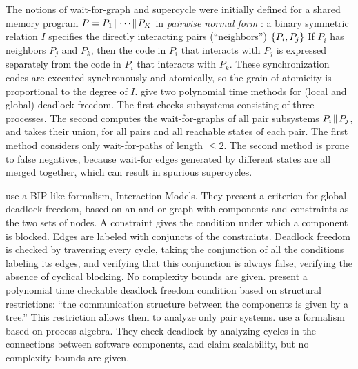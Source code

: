 
The notions of wait-for-graph and supercycle \cite{AC05,AE98}
were initially defined for a shared memory program
$P = P_1 \!\parallel\! \cdots \!\parallel\! P_K$ in \emph{pairwise normal form} \cite{Att16a,Att16b}: a binary
symmetric relation $I$ specifies the directly interacting pairs
(``neighbors'') $\{ P_i, P_j \}$ 
If $P_i$ has neighbors $P_j$ and $P_k$, then 
the code in $P_i$ that interacts with $P_j$ is expressed separately from
the code in $P_i$ that interacts with $P_k$. 
These synchronization codes are executed synchronously and
atomically, so the grain of atomicity is proportional to the
degree of $I$.
%
 give two polynomial time 
methods for (local and global) deadlock freedom.
The first checks subsystems consisting of three
processes. The second computes the wait-for-graphs of all pair subsystems $P_i \!\parallel\! P_j$,
and takes their union, for all pairs
and all reachable states of each pair.
The first method considers only wait-for-paths of length $\le 2$. 
The second method is prone to false negatives,
because wait-for edges generated by different states are
all merged together, which can result in spurious supercycles.


 use a BIP-like
formalism, Interaction Models. %
They present a criterion for global deadlock freedom, based on 
an and-or graph with components and constraints as the two sets of nodes. A
constraint gives the condition
under which a component is blocked. Edges are labeled with conjuncts
of the constraints.  Deadlock freedom is checked by traversing every
cycle, taking the conjunction of all the
conditions labeling its edges, and verifying that this conjunction is
always false, \ie verifying the absence of cyclical blocking.
No complexity bounds are given.
%
 present a polynomial time
checkable deadlock freedom condition based on structural restrictions:
``the communication structure between the components is given by a
tree.'' This restriction allows them to analyze only pair systems.
%
 use a 
formalism based on process algebra. They check deadlock by analyzing cycles in
the connections between software components, and claim scalability, but no
complexity bounds are given.


